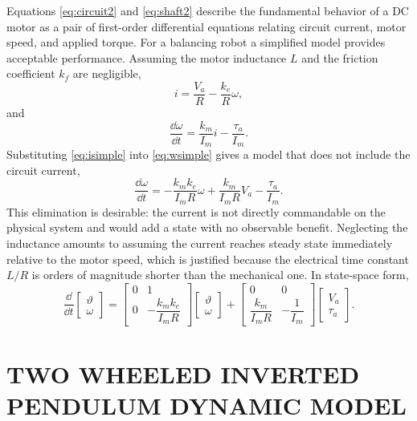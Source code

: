 Equations \eqref{eq:circuit2} and \eqref{eq:shaft2} describe the fundamental
behavior of a DC motor as a pair of first-order differential equations relating
circuit current, motor speed, and applied torque. For a balancing robot a
simplified model provides acceptable performance. Assuming the motor inductance
$L$ and the friction coefficient $k_f$ are negligible,
\begin{equation}\label{eq:isimple}
i=\frac{V_a}{R}-\frac{k_e}{R}\omega ,
\end{equation}
and
\begin{equation}\label{eq:wsimple}
\frac{\dd\omega}{\dd t}=\frac{k_m}{I_m}i-\frac{\tau_a}{I_m} .
\end{equation}
Substituting \eqref{eq:isimple} into \eqref{eq:wsimple} gives a model that does
not include the circuit current,
\begin{equation}\label{eq:motor}
\frac{\dd\omega}{\dd t}
=-\frac{k_mk_e}{I_mR}\omega+\frac{k_m}{I_mR}V_a-\frac{\tau_a}{I_m} .
\end{equation}
This elimination is desirable: the current is not directly commandable on the
physical system and would add a state with no observable benefit. Neglecting the
inductance amounts to assuming the current reaches steady state immediately
relative to the motor speed, which is justified because the electrical time
constant $L/R$ is orders of magnitude shorter than the mechanical one. In
state-space form,
\begin{equation}\label{eq:motorss}
\frac{\dd}{\dd t}
\begin{bmatrix}\vartheta\\\omega\end{bmatrix}
=\begin{bmatrix}
0 & 1\\[4pt]
0 & -\dfrac{k_mk_e}{I_mR}
\end{bmatrix}
\begin{bmatrix}\vartheta\\\omega\end{bmatrix}
+\begin{bmatrix}
0 & 0\\[4pt]
\dfrac{k_m}{I_mR} & -\dfrac{1}{I_m}
\end{bmatrix}
\begin{bmatrix}V_a\\\tau_a\end{bmatrix}.
\end{equation}

\section{TWO WHEELED INVERTED PENDULUM DYNAMIC MODEL}
\label{sec:twipmodel}

